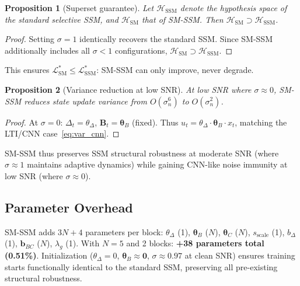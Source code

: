 \documentclass[journal]{IEEEtran}
\newtheorem{proposition}{Proposition}
\begin{document}
\begin{proposition}[Superset guarantee]
\label{prop:superset}
Let $\mathcal{H}_{\text{SSM}}$ denote the hypothesis space of the standard selective SSM, and $\mathcal{H}_{\text{SM}}$ that of SM-SSM. Then $\mathcal{H}_{\text{SM}} \supset \mathcal{H}_{\text{SSM}}$.
\end{proposition}
\begin{proof}
Setting $\sigma{=}1$ identically recovers the standard SSM. Since SM-SSM additionally includes all $\sigma{<}1$ configurations, $\mathcal{H}_{\text{SM}} \supset \mathcal{H}_{\text{SSM}}$.
\end{proof}

This ensures $\mathcal{L}^*_{\text{SM}} \leq \mathcal{L}^*_{\text{SSM}}$: SM-SSM can only improve, never degrade.

\begin{proposition}[Variance reduction at low SNR]
\label{prop:var_reduction}
At low SNR where $\sigma \approx 0$, SM-SSM reduces state update variance from $O(\sigma_n^6)$ to $O(\sigma_n^2)$.
\end{proposition}
\begin{proof}
At $\sigma{=}0$: $\Delta_t = \theta_\Delta$, $\mathbf{B}_t = \bm{\theta}_B$ (fixed). Thus $u_t = \theta_\Delta \cdot \bm{\theta}_B \cdot x_t$, matching the LTI/CNN case~\eqref{eq:var_cnn}.
\end{proof}

SM-SSM thus preserves SSM structural robustness at moderate SNR (where $\sigma \approx 1$ maintains adaptive dynamics) while gaining CNN-like noise immunity at low SNR (where $\sigma \approx 0$).

\subsection{Parameter Overhead}

SM-SSM adds $3N{+}4$ parameters per block: $\theta_\Delta$ (1), $\bm{\theta}_B$ ($N$), $\bm{\theta}_C$ ($N$), $s_{\text{scale}}$ (1), $b_\Delta$ (1), $\mathbf{b}_{BC}$ ($N$), $\lambda_g$ (1).
With $N{=}5$ and 2 blocks: \textbf{+38 parameters total (0.51\%)}.
Initialization ($\theta_\Delta{=}0$, $\bm{\theta}_B \approx \mathbf{0}$, $\sigma \approx 0.97$ at clean SNR) ensures training starts functionally identical to the standard SSM, preserving all pre-existing structural robustness.


\end{document}
